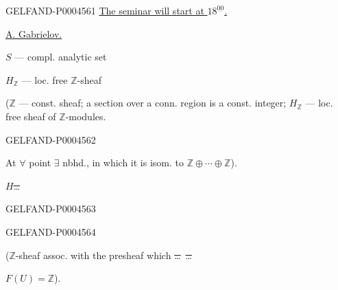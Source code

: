 \begin{GelfandAdjacentEvidence}{GELFAND-P000456}{1}
\underline{The seminar will start at \mbox{$18^{\underline{00}}$}.}

\qquad \underline{A. Gabrielov.}

$S$ — compl. analytic set

$H_{\mathbb Z}$ — loc. free $\mathbb Z$-sheaf

($\mathbb Z$ — const. sheaf; a section over a conn. region is a const. integer;
$H_{\mathbb Z}$ — loc. free sheaf of $\mathbb Z$-modules.
\end{GelfandAdjacentEvidence}
\begin{GelfandAdjacentEvidence}{GELFAND-P000456}{2}

At $\forall$ point $\exists$ nbhd.,
in which it is isom. to $\mathbb Z\oplus\cdots\oplus\mathbb Z$).

\sout{\mbox{$H$}\ldots}\quad
{}
\end{GelfandAdjacentEvidence}
\begin{GelfandAdjacentEvidence}{GELFAND-P000456}{3}

\end{GelfandAdjacentEvidence}
\begin{GelfandAdjacentEvidence}{GELFAND-P000456}{4}

($\mathbb Z$-sheaf assoc. with the presheaf which \sout{\ldots}\ \sout{\ldots}
\par\noindent\hspace*{2em}$F(U)=\mathbb Z$).
\end{GelfandAdjacentEvidence}
